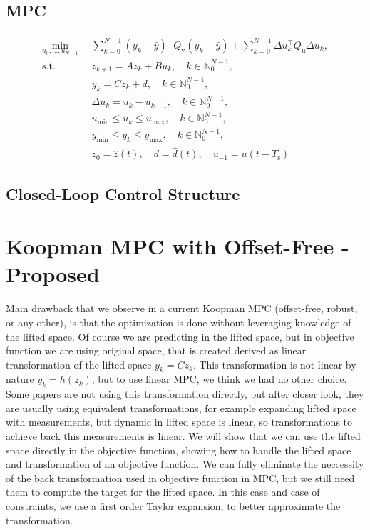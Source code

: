 \documentclass[preprint,12pt,authoryear]{elsarticle}
\begin{document}
\subsection{MPC}
\begin{subequations}
  \label{eq:of:mpc}
  \begin{align}
    \min_{u_0, \ldots, u_{N-1}} \; & \; \sum_{k=0}^{N-1} (y_k - \bar{y})^\intercal Q_\text{y} (y_k - \bar{y}) + \sum_{k=0}^{N-1} \Delta u_k^\intercal Q_\text{u} \Delta u_k, \label{eq:of:mpc:obj} \\
    \text{s.t.} \;\;\;\; & \; z_{k+1} = A z_k + B u_k, \quad k\in\mathbb{N}_0^{N-1}, \label{eq:of:mpc:z} \\
    & \; y_k = C z_k + d, \quad k\in\mathbb{N}_0^{N-1}, \label{eq:of:mpc:y} \\
    & \; \Delta u_k = u_k - u_{k-1}, \quad k\in\mathbb{N}_0^{N-1}, \label{eq:of:mpc:du} \\
    & \; u_{\min} \leq u_k \leq u_{\max}, \quad k\in\mathbb{N}_0^{N-1}, \label{eq:of:mpc:u} \\
    & \; y_{\min} \leq y_k \leq y_{\max}, \quad k\in\mathbb{N}_0^{N-1}, \label{eq:of:mpc:ycon} \\
    & \; z_0 = \hat{z}(t), \quad d = \hat{d}(t), \quad u_{-1} = u(t-T_\text{s}) \label{eq:of:mpc:init}
  \end{align}
\end{subequations}

\subsection{Closed-Loop Control Structure}

\section{Koopman MPC with Offset-Free - Proposed}

Main drawback that we observe in a current Koopman MPC (offset-free, robust, or any other), is that the optimization is done without leveraging knowledge of the lifted space. Of course we are predicting in the lifted space, but in objective function we are using original space, that is created derived as linear transformation of the lifted space \(y_k = Cz_k\). This transformation is not linear by nature \(y_k = h(z_k)\), but to use linear MPC, we think we had no other choice. Some papers are not using this transformation directly, but after closer look, they are usually using equivalent transformations, for example expanding lifted space with measurements, but dynamic in lifted space is linear, so transformations to achieve back this measurements is linear. We will show that we can use the lifted space directly in the objective function, showing how to handle the lifted space and transformation of an objective function.
We can fully eliminate the neccessity of the back transformation used in objective function in MPC, but we still need them to compute the target for the lifted space. In this case and case of constraints, we use a first order Taylor expansion, to better approximate the transformation. 
\end{document}
